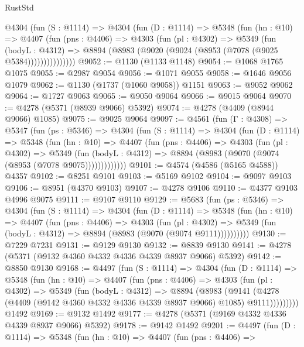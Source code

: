 \begin{lexlean}{RustStd}
\begin{coremodule}
        @4304
          (fun (S : @1114) =>
          @4304
            (fun (D : @1114) =>
            @5348
              (fun (hn : @10) =>
              @4407
                (fun (pns : @4406) =>
                @4303
                  (fun (pl : @4302) =>
                  @5349
                    (fun (bodyL : @4312) =>
                    @8894 (@8983 (@9020 (@9024 (@8953 (@7078 (@9025 @5384)))))))))))))))
@9052 := @1130 (@1133 @1148)
@9054 := @1068 @1765 @1075
@9055 := @2987 @9054
@9056 := @1071 @9055
@9058 := @1646 @9056 @1079
@9062 := @1130 (@1737 (@1060 @9058)) @1151
@9063 := @9052 @9062
@9064 := @1727 @9063
@9065 := @9050 @9064
@9066 := @9015 @9064
@9070 := @4278 (@5371 (@8939 @9066) @5392)
@9074 := @4278 (@4409 (@8944 @9066) @1085)
@9075 := @9025 @9064
@9097 := @4561
    (fun (Γ : @4308) =>
    @5347
      (fun (ps : @5346) =>
      @4304
        (fun (S : @1114) =>
        @4304
          (fun (D : @1114) =>
          @5348
            (fun (hn : @10) =>
            @4407
              (fun (pns : @4406) =>
              @4303
                (fun (pl : @4302) =>
                @5349
                  (fun (bodyL : @4312) =>
                  @8894 (@8983 (@9070 (@9074 (@8953 (@7078 @9075)))))))))))))
@9101 := @4574 (@4586 (@5165 @4588)) @4357
@9102 := @8251 @9101
@9103 := @5169 @9102
@9104 := @9097 @9103
@9106 := @8951 (@4370 @9103)
@9107 := @4278 @9106
@9110 := @4377 @9103 @4996 @9075
@9111 := @9107 @9110
@9129 := @5683
    (fun (ps : @5346) =>
    @4304
      (fun (S : @1114) =>
      @4304
        (fun (D : @1114) =>
        @5348
          (fun (hn : @10) =>
          @4407
            (fun (pns : @4406) =>
            @4303
              (fun (pl : @4302) =>
              @5349 (fun (bodyL : @4312) => @8894 (@8983 (@9070 (@9074 @9111))))))))))
@9130 := @7229 @7231
@9131 := @9129 @9130
@9132 := @8839 @9130
@9141 := @4278 (@5371 (@9132 @4360 @4332 @4336 @4339 @8937 @9066) @5392)
@9142 := @8850 @9130
@9168 := @4497
    (fun (S : @1114) =>
    @4304
      (fun (D : @1114) =>
      @5348
        (fun (hn : @10) =>
        @4407
          (fun (pns : @4406) =>
          @4303
            (fun (pl : @4302) =>
            @5349
              (fun (bodyL : @4312) =>
              @8894
                (@8983
                  (@9141
                    (@4278 (@4409 (@9142 @4360 @4332 @4336 @4339 @8937 @9066) @1085) @9111)))))))))
    @1492
@9169 := @9132 @1492
@9177 := @4278 (@5371 (@9169 @4332 @4336 @4339 @8937 @9066) @5392)
@9178 := @9142 @1492
@9201 := @4497
    (fun (D : @1114) =>
    @5348
      (fun (hn : @10) =>
      @4407
        (fun (pns : @4406) =>

\end{coremodule}
\end{lexlean}

